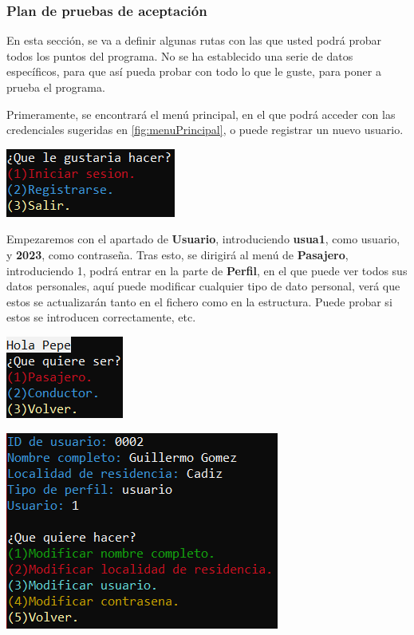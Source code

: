 \subsubsection{Plan de pruebas de aceptación}

En esta sección, se va a definir algunas rutas con las que usted podrá probar todos los puntos del programa. No se ha establecido una serie de datos específicos, para que así pueda probar con
todo lo que le guste, para poner a prueba el programa.

Primeramente, se encontrará el menú principal, en el que podrá acceder con las credenciales sugeridas en \ref{fig:menuPrincipal}, o puede registrar un nuevo usuario.
\begin{center}
\includegraphics[]{FOTOS/menuPrincipal.png}
\end{center}
Empezaremos con el apartado de \textbf{Usuario}, introduciendo \textbf{usua1}, como usuario, y \textbf{2023}, como contraseña. 
Tras esto, se dirigirá al menú de \textbf{Pasajero}, introduciendo 1, podrá entrar en la parte de \textbf{Perfil}, en el que puede ver todos sus datos personales,
aquí puede modificar cualquier tipo de dato personal, verá que estos se actualizarán tanto en el fichero como en la estructura. Puede probar si estos se introducen correctamente, etc.
\begin{center}
    \begin{center}
      \includegraphics[]{FOTOS/menuSeleccionUsuario.png}
    \end{center}
    \begin{center}
      \includegraphics[]{FOTOS/menuPasajeroPerfil.png}
    \end{center}
\end{center}

